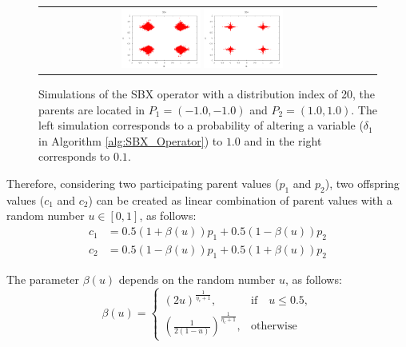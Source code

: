 \begin{figure}[t]
\centering
\begin{tabular}{cc}
   \includegraphics[width=0.25\textwidth]{img/SBX_eta_20_2D_pv_1.png} 
   \includegraphics[width=0.25\textwidth]{img/SBX_eta_20_2D_pv_01.png} 
\end{tabular}
\caption{Simulations of the SBX operator with a distribution index of 20, the parents are located in $P_1=(-1.0, -1.0)$ and $P_2=(1.0, 1.0)$. The left simulation corresponds to a probability of altering a variable ($\delta_1$ in Algorithm \ref{alg:SBX_Operator}) to $1.0$ and in the right corresponds to $0.1$.}
\label{fig:Simulation_pv}
\end{figure}





Therefore, considering two participating parent values ($p_1$ and $p_2$), two offspring values ($c_1$ and $c_2$) can be created as linear combination of parent values with a random number $u \in [0, 1]$, as follows:
\begin{equation} 
\begin{split}
c_1 &= 0.5(1 + \beta(u))p_1 + 0.5(1 - \beta(u)) p_2 \\
c_2 &= 0.5(1 - \beta(u))p_1 + 0.5(1 + \beta(u)) p_2
\end{split}
\end{equation}

The parameter $\beta(u)$ depends on the random number $u$, as follows:
\begin{equation}
    \beta(u)= 
\begin{cases}
     (2u)^{\frac{1}{\eta_c+1}},& \text{if} \quad u \leq 0.5,\\
     	(\frac{1}{2(1-u)})^{\frac{1}{\eta_c +1}} ,& \text{otherwise}
\end{cases}
\end{equation}

